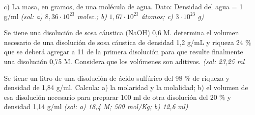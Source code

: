 \begin{multicols}{2}
\begin{problem}
c)	La masa, en gramos, de una molécula de agua.
Dato: Densidad del agua = 1 g/ml \textit{\scriptsize(sol: a) $8,36 \cdot 10^{23}$ molec.; b) $1,67\cdot10^{23}$ átomos; c) $3\cdot10^{23}$ g)}
\end{problem}
\begin{problem}
Se tiene una disolución de sosa cáustica (NaOH) 0,6 M. determina el volumen necesario de una disolución de sosa cáustica de densidad 1,2 g/mL y riqueza 24 \% que se deberá agregar a 11 de la primera disolución para que resulte finalmente una disolución 0,75 M. Considera que los volúmenes son aditivos. \textit{\scriptsize(sol: 23,25 ml}
\end{problem}
\begin{problem}
Se tiene un litro de una disolución de ácido sulfúrico del 98 \% de riqueza y densidad de 1,84 g/ml.
Calcula: a) la molaridad y la molalidad; b) el volumen de esa disolución necesario para preparar 100 ml de otra disolución del 20 \% y densidad 1,14 g/ml \textit{\scriptsize(sol: a) 18,4 M; 500 mol/Kg; b) 12,6 ml)}
	

\end{problem}
\end{multicols}
